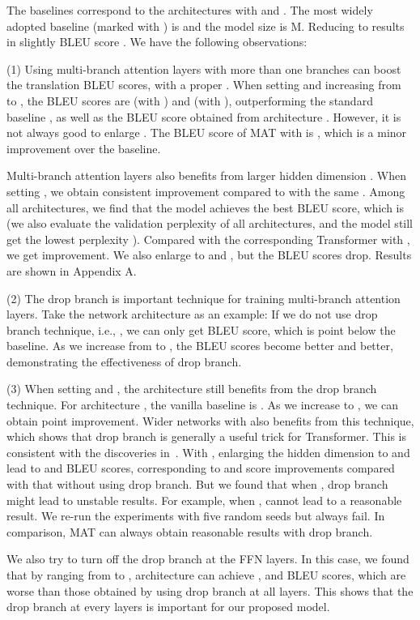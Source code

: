 \documentclass{article}
\begin{document}
The baselines correspond to the architectures with  and . The most widely adopted baseline (marked with ) is  and the model size is M. Reducing  to  results in slightly BLEU score . We have the following  observations:

\noindent(1) Using multi-branch attention layers with more than one branches can boost the translation BLEU scores, with a proper . When setting  and increasing  from  to , the BLEU scores are  (with ) and  (with ), outperforming the standard baseline , as well as the BLEU score obtained from architecture . However, it is not always good to enlarge . The BLEU score of MAT with  is , which is a minor improvement over the baseline.

Multi-branch attention layers also benefits from larger hidden dimension . When setting , we obtain consistent improvement compared to  with the same . Among all architectures, we find that the model  achieves the best BLEU score, which is  (we also evaluate the validation perplexity of all architectures, and the model  still get the lowest perplexity ). Compared with the corresponding Transformer  with , we get  improvement. We also enlarge  to  and , but the BLEU scores drop. Results are shown in Appendix A.

\noindent(2) The drop branch is important technique for training multi-branch attention layers. Take the network architecture  as an example: If we do not use drop branch technique, i.e., , we can only get  BLEU score, which is  point below the baseline. As we increase  from  to , the BLEU scores become better and better, demonstrating the effectiveness of drop branch. 

\noindent(3) When setting  and , the architecture still benefits from the drop branch technique. For architecture , the vanilla baseline is . As we increase  to , we can obtain  point improvement. Wider networks with  also benefits from this technique, which shows that drop branch is generally a useful trick for Transformer. This is consistent with the discoveries in~\cite{fan2020reducing}. With , enlarging the hidden dimension to  and  lead to  and  BLEU scores, corresponding to  and  score improvements compared with that without using drop branch. But we found that when , drop branch might lead to unstable results. For example, when ,  cannot lead to a reasonable result. We re-run the experiments with five random seeds but always fail. In comparison, MAT can always obtain reasonable results with drop branch.

We also try to turn off the drop branch at the FFN layers. In this case, we found that by ranging  from  to , architecture  can achieve ,  and  BLEU scores, which are worse than those obtained by using drop branch at all layers. This shows that the drop branch at every layers is important for our proposed model.
\end{document}
